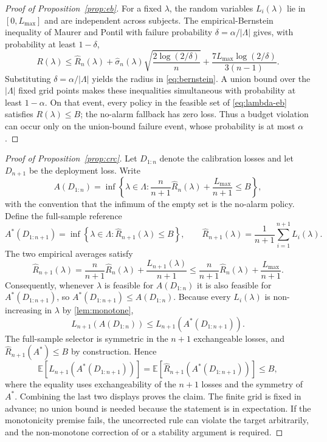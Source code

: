 \begin{proof}[Proof of Proposition~\ref{prop:eb}]
For a fixed $\lambda$, the random variables $L_i(\lambda)$ lie in $[0,L_{\max}]$ and are independent across subjects. The empirical-Bernstein inequality of Maurer and Pontil \citep{maurer2009empirical} with failure probability $\delta=\alpha/|\Lambda|$ gives, with probability at least $1-\delta$,
\begin{equation*}
R(\lambda)\le\widehat R_n(\lambda)
+\widehat\sigma_n(\lambda)\sqrt{\frac{2\log(2/\delta)}{n}}
+\frac{7L_{\max}\log(2/\delta)}{3(n-1)}.
\end{equation*}
Substituting $\delta=\alpha/|\Lambda|$ yields the radius in \eqref{eq:bernstein}. A union bound over the $|\Lambda|$ fixed grid points makes these inequalities simultaneous with probability at least $1-\alpha$. On that event, every policy in the feasible set of \eqref{eq:lambda-eb} satisfies $R(\lambda)\le B$; the no-alarm fallback has zero loss. Thus a budget violation can occur only on the union-bound failure event, whose probability is at most $\alpha$.
\end{proof}

\begin{proof}[Proof of Proposition~\ref{prop:crc}]
Let $D_{1:n}$ denote the calibration losses and let $D_{n+1}$ be the deployment loss. Write
\[
A(D_{1:n})=\inf\left\{\lambda\in\Lambda:
\frac{n}{n+1}\widehat R_n(\lambda)+\frac{L_{\max}}{n+1}\le B\right\},
\]
with the convention that the infimum of the empty set is the no-alarm policy. Define the full-sample reference
\[
A^*(D_{1:n+1})=\inf\left\{\lambda\in\Lambda:
\widehat R_{n+1}(\lambda)\le B\right\},
\qquad
\widehat R_{n+1}(\lambda)=\frac{1}{n+1}\sum_{i=1}^{n+1}L_i(\lambda).
\]
The two empirical averages satisfy
\[
\widehat R_{n+1}(\lambda)
=\frac{n}{n+1}\widehat R_n(\lambda)+\frac{L_{n+1}(\lambda)}{n+1}
\le \frac{n}{n+1}\widehat R_n(\lambda)+\frac{L_{\max}}{n+1}.
\]
Consequently, whenever $\lambda$ is feasible for $A(D_{1:n})$ it is also feasible for $A^*(D_{1:n+1})$, so $A^*(D_{1:n+1})\le A(D_{1:n})$. Because every $L_i(\lambda)$ is non-increasing in $\lambda$ by \cref{lem:monotone},
\[
L_{n+1}(A(D_{1:n}))\le L_{n+1}(A^*(D_{1:n+1})).
\]
The full-sample selector is symmetric in the $n+1$ exchangeable losses, and $\widehat R_{n+1}(A^*)\le B$ by construction. Hence
\[
\mathbb E[L_{n+1}(A^*(D_{1:n+1}))]
=\mathbb E[\widehat R_{n+1}(A^*(D_{1:n+1}))]
\le B,
\]
where the equality uses exchangeability of the $n+1$ losses and the symmetry of $A^*$. Combining the last two displays proves the claim. The finite grid is fixed in advance; no union bound is needed because the statement is in expectation. If the monotonicity premise fails, the uncorrected rule can violate the target arbitrarily, and the non-monotone correction of \cite{angelopoulos2026conformal} or a stability argument is required.
\end{proof}

